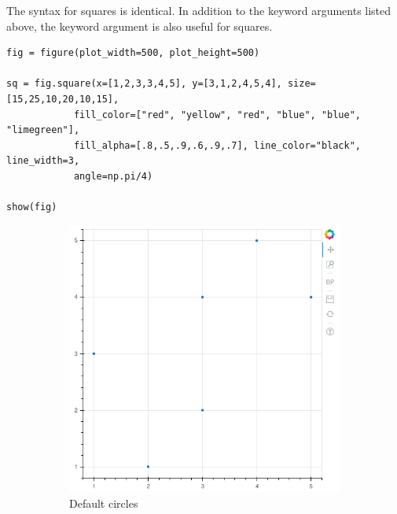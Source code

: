 The syntax for squares is identical. In addition to the keyword arguments listed
above, the  keyword argument is also useful for squares.

\begin{lstlisting}
fig = figure(plot_width=500, plot_height=500)

sq = fig.square(x=[1,2,3,3,4,5], y=[3,1,2,4,5,4], size=[15,25,10,20,10,15],
            fill_color=["red", "yellow", "red", "blue", "blue", "limegreen"],
            fill_alpha=[.8,.5,.9,.6,.9,.7], line_color="black", line_width=3,
            angle=np.pi/4)

show(fig)
\end{lstlisting}

\begin{figure}
    \begin{subfigure}{.33\textwidth}
        \centering
            \includegraphics[width=.9\linewidth]{BokehFigs/circles.png}
            \caption{Default circles}
            \label{fig:circles}
    \end{subfigure}%
    \begin{subfigure}{.33\textwidth}
        \centering

\end{subfigure}
\end{figure}
